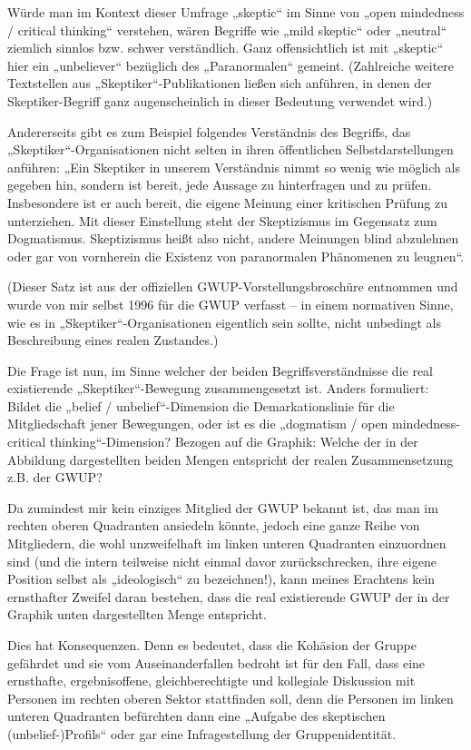 Würde man im Kontext dieser Umfrage „skeptic`` im Sinne von „open
mindedness / critical thinking`` verstehen, wären Begriffe wie „mild
skeptic`` oder „neutral`` ziemlich sinnlos bzw. schwer verständlich.
Ganz offensichtlich ist mit „skeptic`` hier ein „unbeliever`` bezüglich
des „Paranormalen`` gemeint. (Zahlreiche weitere Textstellen aus
„Skeptiker``-Publikationen ließen sich anführen, in denen der
Skeptiker-Begriff ganz augenscheinlich in dieser Bedeutung verwendet
wird.)

Andererseits gibt es zum Beispiel folgendes Verständnis des Begriffs,
das „Skeptiker``-Organisationen nicht selten in ihren öffentlichen
Selbstdarstellungen anführen: „Ein Skeptiker in unserem Verständnis
nimmt so wenig wie möglich als gegeben hin, sondern ist bereit, jede
Aussage zu hinterfragen und zu prüfen. Insbesondere ist er auch bereit,
die eigene Meinung einer kritischen Prüfung zu unterziehen. Mit dieser
Einstellung steht der Skeptizismus im Gegensatz zum Dogmatismus.
Skeptizismus heißt also nicht, andere Meinungen blind abzulehnen oder
gar von vornherein die Existenz von paranormalen Phänomenen zu
leugnen``.

(Dieser Satz ist aus der offiziellen GWUP-Vorstellungsbroschüre
entnommen und wurde von mir selbst 1996 für die GWUP verfasst -- in
einem normativen Sinne, wie es in „Skeptiker``-Organisationen eigentlich
sein sollte, nicht unbedingt als Beschreibung eines realen Zustandes.)

Die Frage ist nun, im Sinne welcher der beiden Begriffsverständnisse die
real existierende „Skeptiker``-​Bewegung zusammengesetzt ist. Anders
formuliert: Bildet die „belief / unbelief``-​Dimension die
Demarkationslinie für die Mitgliedschaft jener Bewegungen, oder ist es
die „dogmatism / open mindedness-critical thinking``-Dimension? Bezogen
auf die Graphik: Welche der in der Abbildung dargestellten beiden Mengen
entspricht der realen Zusammensetzung z.B. der GWUP?

Da zumindest mir kein einziges Mitglied der GWUP bekannt ist, das man im
rechten oberen Quadranten ansiedeln könnte, jedoch eine ganze Reihe von
Mitgliedern, die wohl unzweifelhaft im linken unteren Quadranten
einzuordnen sind (und die intern teilweise nicht einmal davor
zurückschrecken, ihre eigene Position selbst als „ideologisch`` zu
bezeichnen!), kann meines Erachtens kein ernsthafter Zweifel daran
bestehen, dass die real existierende GWUP der in der Graphik unten
dargestellten Menge entspricht.

Dies hat Konsequenzen. Denn es bedeutet, dass die Kohäsion der Gruppe
gefährdet und sie vom Auseinanderfallen bedroht ist für den Fall, dass
eine ernsthafte, ergebnisoffene, gleichberechtigte und kollegiale
Diskussion mit Personen im rechten oberen Sektor stattfinden soll, denn
die Personen im linken unteren Quadranten befürchten dann eine „Aufgabe
des skeptischen (unbelief-)Profils`` oder gar eine Infragestellung der
Gruppenidentität.

